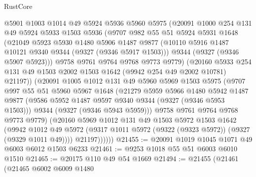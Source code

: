 \begin{lexlean}{RustCore}
\begin{coremodule}
            @5901
            @1003
            @1014
            @49
            @5924
            @5936
            @5960
            @5975
            (@20091
              @1000
              @254
              @131
              @49
              @5924
              @5933
              @1503
              @5936
              (@9707
                @982
                @55
                @51
                @5924
                @5931
                @1648
                (@21049
                  @5923
                  @5930
                  @1480
                  @5906
                  @1487
                  @9877
                  (@10110 @5916 @1487 @10121 @9340 @9344 (@9327 (@9346 @5917 @1503)))
                  @9344
                  (@9327 (@9346 @5907 @5923)))
                @9758
                @9761
                @9764
                @9768
                @9773
                @9779)
              (@20160
                @5933
                @254
                @131
                @49
                @1503
                @2002
                @1503
                @1642
                (@9942 @254 @49 @2002 @10781)
                @21197))
            (@20091
              @1005
              @1012
              @131
              @49
              @5960
              @5969
              @1503
              @5975
              (@9707
                @997
                @55
                @51
                @5960
                @5967
                @1648
                (@21279
                  @5959
                  @5966
                  @1480
                  @5942
                  @1487
                  @9877
                  (@9586 @5952 @1487 @9597 @9340 @9344 (@9327 (@9346 @5953 @1503)))
                  @9344
                  (@9327 (@9346 @5943 @5959)))
                @9758
                @9761
                @9764
                @9768
                @9773
                @9779)
              (@20160
                @5969
                @1012
                @131
                @49
                @1503
                @5972
                @1503
                @1642
                (@9942
                  @1012
                  @49
                  @5972
                  (@9317 @1011 @5972 (@9322 (@9323 @5972)) (@9327 (@9329 @1011 @49))))
                @21197))))))
@21455 := @20091 @1019 @1045 @1071 @49 @6003 @6012 @1503 @6233
@21461 := @9253 @1018 @55 @51 @6003 @6010 @1510
@21465 := @20175 @110 @49 @54 @1669
@21494 := @21455
    (@21461
      (@21465
        @6002
        @6009
        @1480

\end{coremodule}
\end{lexlean}
